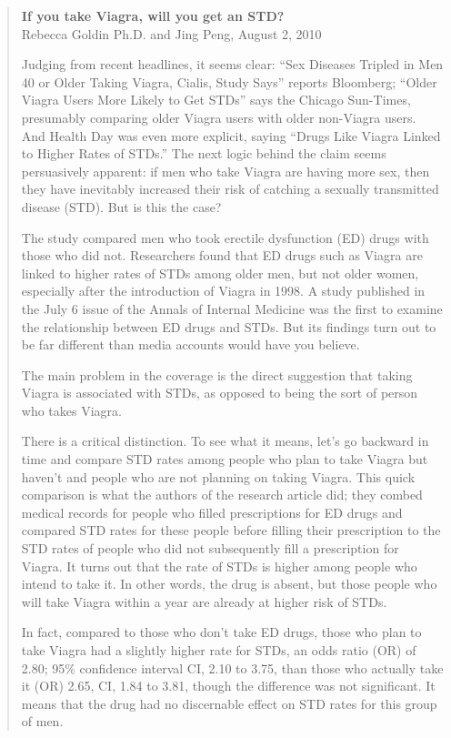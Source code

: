\documentclass[11pt, chapterprefix=true]{scrbook}\usepackage[]{graphicx}\usepackage[]{color}
\begin{document}
\begin{quotation}
\textbf{If you take Viagra, will you get an STD?} \\
Rebecca Goldin Ph.D. and Jing Peng, August 2, 2010 

Judging from recent headlines, it seems clear:  ``Sex Diseases Tripled in Men 40 or Older Taking Viagra, Cialis, Study Says'' reports Bloomberg; ``Older Viagra Users More Likely to Get STDs'' says the Chicago Sun-Times, presumably comparing older Viagra users with older non-Viagra users.  And Health Day was even more explicit, saying ``Drugs Like Viagra Linked to Higher Rates of STDs.''  The next logic behind the claim seems persuasively apparent: if men who take Viagra are having more sex, then they have inevitably increased their risk of catching a sexually transmitted disease (STD). But is this the case?

The study compared men who took erectile dysfunction (ED) drugs with those who did not.  Researchers found that ED drugs such as Viagra are linked to higher rates of STDs among older men, but not older women, especially after the introduction of Viagra in 1998.  A study published in the July 6 issue of the Annals of Internal Medicine was the first to examine the relationship between ED drugs and STDs. But its findings turn out to be far different than media accounts would have you believe.

The main problem in the coverage is the direct suggestion that taking Viagra is associated with STDs, as opposed to being the sort of person who takes Viagra.

There is a critical distinction. To see what it means, let's go backward in time and compare STD rates among people who plan to take Viagra but haven't and people who are not planning on taking Viagra. This quick comparison is what the authors of the research article did; they combed medical records for people who filled prescriptions for ED drugs and compared STD rates for these people before filling their prescription to the STD rates of people who did not subsequently fill a prescription for Viagra.  It turns out that the rate of STDs is higher among people who intend to take it.  In other words, the drug is absent, but those people who will take Viagra within a year are already at higher risk of STDs.

In fact, compared to those who don't take ED drugs, those who plan to take Viagra had a slightly higher rate for STDs, an odds ratio (OR) of 2.80; 95\% confidence interval CI, 2.10 to 3.75, than those who actually take it (OR) 2.65, CI, 1.84 to 3.81, though the difference was not significant. It means that the drug had no discernable effect on STD rates for this group of men.
\citep{goldin2010}
\end{quotation}
\end{document}

